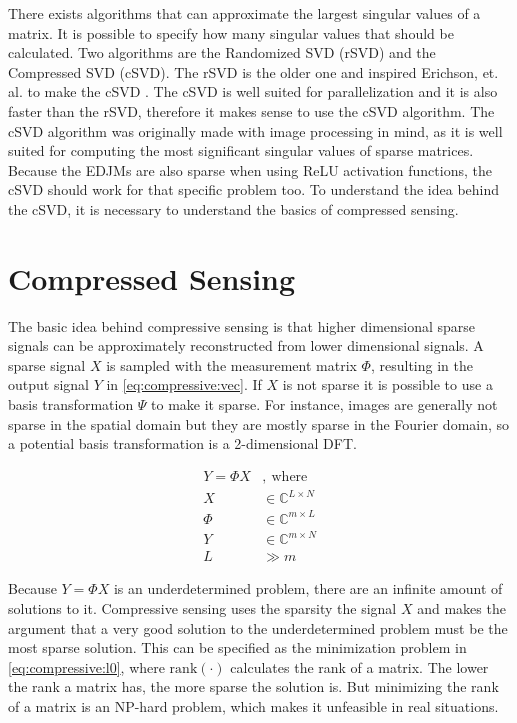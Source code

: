 There exists algorithms that can approximate the largest singular values of a matrix. It is possible to specify how many singular values that should be calculated. Two algorithms are the Randomized SVD (rSVD) and the Compressed SVD (cSVD). The rSVD is the older one and inspired Erichson, et. al. to make the cSVD \cite{erichson:csvd}. The cSVD is well suited for parallelization and it is also faster than the rSVD, therefore it makes sense to use the cSVD algorithm. The cSVD algorithm was originally made with image processing in mind, as it is well suited for computing the most significant singular values of sparse matrices. Because the EDJMs are also sparse when using ReLU activation functions, the cSVD should work for that specific problem too. To understand the idea behind the cSVD, it is necessary to understand the basics of compressed sensing.

\section{Compressed Sensing}

The basic idea behind compressive sensing is that higher dimensional sparse signals can be approximately reconstructed from lower dimensional signals. A sparse signal $X$ is sampled with the measurement matrix $\Phi$, resulting in the output signal $Y$ in \eqref{eq:compressive:vec}. If $X$ is not sparse it is possible to use a basis transformation $\Psi$ to make it sparse. For instance, images are generally not sparse in the spatial domain but they are mostly sparse in the Fourier domain, so a potential basis transformation is a 2-dimensional DFT.

\begin{equation} \label{eq:compressive:vec}
\begin{split}
    Y = \Phi X &, \ \mathrm{where}      \\
    X &\in \mathbb{C}^{L \times N}      \\
    \Phi &\in \mathbb{C}^{m \times L}   \\
    Y &\in \mathbb{C}^{m \times N}      \\
    L &\gg m
\end{split}
\end{equation}

Because $Y = \Phi X$ is an underdetermined problem, there are an infinite amount of solutions to it. Compressive sensing uses the sparsity the signal $X$ and makes the argument that a very good solution to the underdetermined problem must be the most sparse solution. This can be specified as the minimization problem in \eqref{eq:compressive:l0}, where $\mathrm{rank}(\cdot)$ calculates the rank of a matrix. The lower the rank a matrix has, the more sparse the solution is. But minimizing the rank of a matrix is an NP-hard problem, which makes it unfeasible in real situations.

